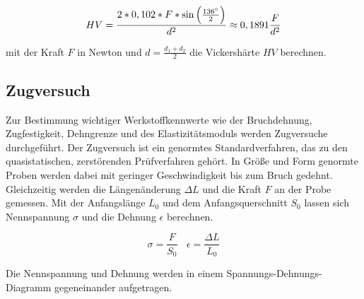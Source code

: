 \begin{equation}
\centering
HV=\frac {2*0,102*F*\sin \left( \frac{136^\circ}{2}\right) } {d^2} \approx 0,1891 \frac{F}{d^2}
	\label{eq:HV}
\end{equation}

mit der Kraft $F$ in Newton und $d=\frac {d_1 + d_2}{2} $ die Vickershärte $HV$ berechnen. 

\subsection{Zugversuch}
Zur Bestimmung wichtiger Werkstoffkennwerte wie der Bruchdehnung, Zugfestigkeit, Dehngrenze und des Elastizitätsmoduls werden Zugversuche durchgeführt. Der Zugversuch ist ein genormtes Standardverfahren, das zu den quasistatischen, zerstörenden Prüfverfahren gehört. In Größe und Form genormte Proben werden dabei mit geringer Geschwindigkeit bis zum Bruch gedehnt. Gleichzeitig werden die Längenänderung $\Delta L$ und die Kraft $F$ an der Probe gemessen. Mit der Anfangslänge $L_0$ und dem Anfangsquerschnitt $S_0$ lassen sich Nennspannung $\sigma$ und die Dehnung $\epsilon$ berechnen.

\begin{equation}
	\sigma=\frac{F}{S_0} ~~~~
	\epsilon=\frac{\Delta L} {L_0}
\end{equation}

Die Nennspannung und Dehnung werden in einem Spannungs-Dehnungs-Diagramm gegeneinander aufgetragen. 